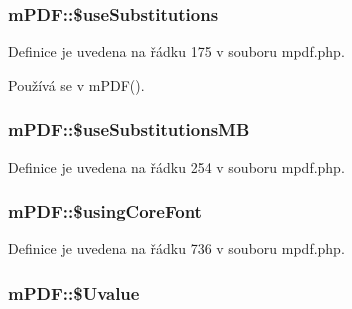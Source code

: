 \hypertarget{classm_p_d_f_a34f67edd17b6117b6adc30edb0220a9f}{
\subsubsection[{\$use\-Substitutions}]{\setlength{\rightskip}{0pt plus 5cm}m\-P\-D\-F\-::\$use\-Substitutions}}\label{classm_p_d_f_a34f67edd17b6117b6adc30edb0220a9f}


Definice je uvedena na řádku 175 v souboru mpdf.\-php.



Používá se v m\-P\-D\-F().

\hypertarget{classm_p_d_f_a01d684e2711849f2c592ba34cc22ee0b}{
\subsubsection[{\$use\-Substitutions\-M\-B}]{\setlength{\rightskip}{0pt plus 5cm}m\-P\-D\-F\-::\$use\-Substitutions\-M\-B}}\label{classm_p_d_f_a01d684e2711849f2c592ba34cc22ee0b}


Definice je uvedena na řádku 254 v souboru mpdf.\-php.

\hypertarget{classm_p_d_f_aa25b3fb0d9b5b95b9ccbe08c1a5077be}{
\subsubsection[{\$using\-Core\-Font}]{\setlength{\rightskip}{0pt plus 5cm}m\-P\-D\-F\-::\$using\-Core\-Font}}\label{classm_p_d_f_aa25b3fb0d9b5b95b9ccbe08c1a5077be}


Definice je uvedena na řádku 736 v souboru mpdf.\-php.

\hypertarget{classm_p_d_f_a4987e5027c7120313961e48e9e0cd333}{
\subsubsection[{\$\-Uvalue}]{\setlength{\rightskip}{0pt plus 5cm}m\-P\-D\-F\-::\$\-Uvalue}}\label{classm_p_d_f_a4987e5027c7120313961e48e9e0cd333}



